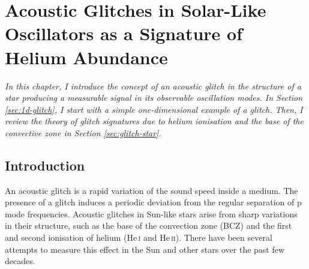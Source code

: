 %
%
%
%
%
\chapter[Acoustic Glitches in Solar-Like Oscillators]{Acoustic Glitches in Solar-Like Oscillators as a Signature of Helium Abundance}\label{chap:glitch}

\textit{In this chapter, I introduce the concept of an acoustic glitch in the structure of a star producing a measurable signal in its observable oscillation modes. In Section \ref{sec:1d-glitch}, I start with a simple one-dimensional example of a glitch. Then, I review the theory of glitch signatures due to helium ionisation and the base of the convective zone in Section \ref{sec:glitch-star}.}

\section{Introduction}


An acoustic glitch is a rapid variation of the sound speed inside a medium. The presence of a glitch induces a periodic deviation from the regular separation of p mode frequencies. Acoustic glitches in Sun-like stars arise from sharp variations in their structure, such as the base of the convection zone (BCZ) and the first and second ionisation of helium (He\,\textsc{i} and He\,\textsc{ii}). There have been several attempts to measure this effect in the Sun and other stars over the past few decades.

